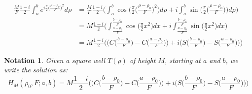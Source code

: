 \documentclass[oneside]{book}
\theoremstyle{mystyle}
\newtheorem{notation}{Notation}[section]
\begin{document}
\begin{align*}
\nonumber \frac{M}{F}\frac{1-i}{2}\int_{a}^{b}e^{i\frac{\pi}{2}\big(\frac{\rho-\rho_0}{F}\big)^2}d\rho &= \frac{M}{F}\frac{1-i}{2}\Bigg(\int_{a}^{b} \cos\bigg(\frac{\pi}{2}\big(\frac{\rho-\rho_0}{F}\big)^2\bigg)d\rho + i\int_{a}^{b} \sin\bigg(\frac{\pi}{2}\big(\frac{\rho-\rho_0}{F}\big)\bigg)d\rho\Bigg) \\
 &= M\frac{1-i}{2}\Bigg(\int_{\frac{a-\rho_0}{F}}^{\frac{b-\rho_0}{F}}\cos\bigg(\frac{\pi}{2}x^2\bigg)dx + i\int_{\frac{a-\rho_0}{F}}^{\frac{b-\rho_0}{F}}\sin\bigg(\frac{\pi}{2}x^2\bigg)dx\Bigg)\\
\nonumber &= M\frac{1-i}{2}\Bigg(\bigg(C\big(\frac{b-\rho_0}{F}\big)-C\big(\frac{a-\rho_0}{F}\big)\bigg)+i\bigg(S\big(\frac{b-\rho_0}{F}\big)-S\big(\frac{a-\rho_0}{F}\big)\bigg)\Bigg)
\end{align*}
\begin{notation}
Given a square well $T(\rho)$ of height $M$, starting at $a$ and $b$, we write the solution as:
\begin{equation*}
H_{M}(\rho_0,F;a,b) = M\frac{1-i}{2}\Bigg(\bigg(C\big(\frac{b-\rho_0}{F}\big)-C\big(\frac{a-\rho_0}{F}\big)\bigg)+i\bigg(S\big(\frac{b-\rho_0}{F}\big)-S\big(\frac{a-\rho_0}{F}\big)\bigg)\Bigg)
\end{equation*}
\end{notation}
\end{document}

